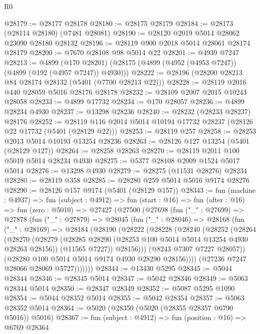\begin{lexlean}{R0}
\begin{coremodule}
@28179 := @28177 @28178
@28180 := @28175 @28179
@28184 := @28173 (@28114 @28180) (@7481 @28081)
@28190 := @28120 @2019 @5014 @28062 @23090 @28180 @28132
@28196 := @28119 @900 @2018 @5014 @28061 @28174 @28179
@28200 := @7670 @28108 @98 @5014 @22
@28201 := @4939 @7247
@28213 := @4899
    (@170 @28201)
    (@28175 (@4899 (@4952 (@4953 @7247)) (@4899 (@192 (@4957 @7247)) @4930)))
@28222 := @28196 (@28200 @28213 @84 @28174 @28132 (@5401 (@7700 @28213 @22)))
@28228 := @28119 @2016 @440 @28059 @5016 @28176 @28178
@28232 := @28109 @2007 @2015 @10243 @28058
@28233 := @4899 @17732
@28234 := @170 @28057
@28236 := @4899 @28234 @4930
@28237 := @13298 @28236
@28240 := @28232 (@28233 @28237) @28176
@28252 := @28119 @116 @2014 @5014 @10194 @17732 @28237 (@28126 @22 @17732 (@5401 (@28129 @22)))
@28253 := @28119 @257
@28258 := @28253 @2013 @5014 @10193 @13254 @28236
@28263 := @28126 @127 @13254 (@5401 (@28129 @127))
@28264 := @28258 @28263
@28270 := @28119 @2011 @100 @5019 @5014 @28234 @4930
@28275 := @5377 @28108 @2009 @1524 @5017 @5014
@28276 := @13298 @4930
@28279 := @28275 (@11531 @28276) @28234
@28280 := @28119 @358
@28285 := @28280 @259 @5014 @5016 @9174 @28276
@28290 := @28126 @157 @9174 (@5401 (@28129 @157))
@28343 := fun (machine : @4937) =>
  fun (subject : @4912) =>
  fun (start : @16) =>
  fun (after : @16) =>
  fun (zero : @5010) =>
  @27427
    (@27500
      (@27698
        (fun ("_" : @27699) =>
        @27878
          (fun ("_" : @27879) =>
          @28045
            (fun ("_" : @28046) =>
            @28168
              (fun ("_" : @28169) =>
              @28184
                (@28190
                  (@28222
                    (@28228
                      (@28240
                        (@28252
                          (@28264
                            (@28270
                              (@28279
                                (@28285 @28290 (@28253 @100 @5014 @5014 @13254 @4930 @28263 @28156))
                                (@11565 @7227))
                              @28156)))
                        (@8243 @7307 @7227 @28057))
                      (@28280 @100 @5014 @5014 @9174 @4930 @28290 @28156))))
                (@27236 @7247 @28066 @28069 @5727)))))))
@28344 := @13430 @5295
@28345 := @5044 @28344
@28346 := @28345 @5014
@28347 := @5042 @28346
@28349 := @5063 @28344 @5014
@28350 := @28347 @28349
@28352 := @5087 @5295 @1090
@28354 := @5044 @28352 @5014
@28355 := @5042 @28354
@28357 := @5063 @28352 @5014
@28364 := @5020 (@28350 (@5020 (@28355 @28357 @6790 @5016)) @5016)
@28367 := fun (subject : @4912) => fun (position : @16) => @6769 @28364

\end{coremodule}
\end{lexlean}
